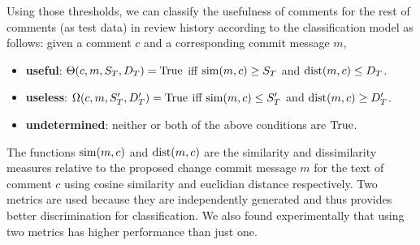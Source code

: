 Using those thresholds, we can classify the usefulness of comments for the rest of comments (as test data) in review history according to the classification model as follows: given a comment $c$ and a corresponding commit message $m$,
\begin{itemize}
\item \textbf{useful}: $\Theta(c,m,S_T,D_T) = \operatorname{True}$ iff $\operatorname{sim}(m,c) \geq S_T$ and $\operatorname{dist}(m,c) \leq D_T$.
\item \textbf{useless}: $\Omega(c,m,S'_T,D'_T) = \operatorname{True}$ iff $\operatorname{sim}(m,c) \leq  S'_T$ and $\operatorname{dist}(m,c) \geq D'_T$.
\item \textbf{undetermined}: neither or both of the above conditions are $\operatorname{True}$.
\end{itemize}

The functions $\operatorname{sim}(m,c)$ and $\operatorname{dist}(m,c)$ are the similarity and dissimilarity measures relative to the proposed change commit message $m$ for the text of comment $c$ using cosine similarity and euclidian distance respectively.
Two metrics are used because they are independently generated and thus provides better discrimination for classification.
We also found experimentally that using two metrics has higher performance than just one. 


